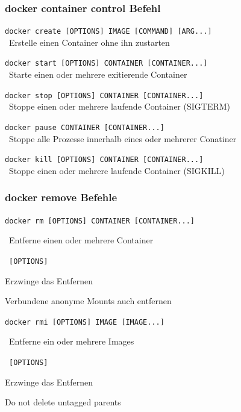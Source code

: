 \documentclass[22pt]{beamer}
\newcommand{\code}[1]{\colorbox{darkgray!20}{\texttt{#1}}}
\newcommand{\desclabel}[1]{\textcolor{cyan}{#1}}
\begin{document}
\begin{frame}
    \frametitle{docker container control Befehl}

    \code{docker create [OPTIONS] IMAGE [COMMAND] [ARG...]}\\
    \-  \ Erstelle einen Container ohne ihn zustarten \medskip

    \code{docker start [OPTIONS] CONTAINER [CONTAINER...]}\\
    \-  \ Starte einen oder mehrere exitierende Container \medskip

    \code{docker stop [OPTIONS] CONTAINER [CONTAINER...]}\\
    \-  \ Stoppe einen oder mehrere laufende Container (SIGTERM) \medskip

    \code{docker pause CONTAINER [CONTAINER...]}\\
    \-  \ Stoppe alle Prozesse innerhalb eines oder mehrerer Conatiner \medskip

    \code{docker kill [OPTIONS] CONTAINER [CONTAINER...]}\\
    \-  \ Stoppe einen oder mehrere laufende Container (SIGKILL) \medskip
    
\end{frame}

\begin{frame}
    \frametitle{docker remove Befehle}
    \code{docker rm [OPTIONS] CONTAINER [CONTAINER...]}

    \- \ Entferne einen oder mehrere Container\vspace{5pt}

    \-  \ \code{[OPTIONS]}
    \begin{description}[labelindent=0.5cm, style=unboxed, labelwidth=\widthof{-v, -\,-volumess}, leftmargin=!]
        \item[\desclabel{-f, -\,-force}] Erzwinge das Entfernen
        \item[\desclabel{-v, -\,-volumes}] Verbundene anonyme Mounts auch entfernen
    \end{description}\medskip\medskip
    \code{docker rmi [OPTIONS] IMAGE [IMAGE...]}

    \- \ Entferne ein oder mehrere Images\vspace{5pt}

    \-  \ \code{[OPTIONS]}
    \begin{description}[labelindent=0.5cm, style=unboxed, labelwidth=\widthof{-\,-no-prunes}, leftmargin=!]
        \item[\desclabel{-f, -\,-force}] Erzwinge das Entfernen
        \item[\desclabel{-\,-no-prune}] Do not delete untagged parents
    \end{description}
\end{frame}
\end{document}
